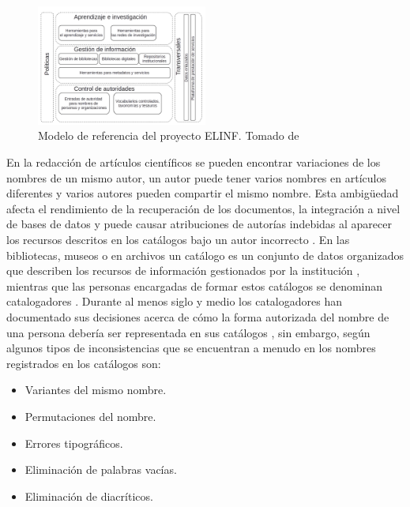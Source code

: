 \begin{figure}
\begin{center}
	\includegraphics[width=0.5\textwidth]{img/referenceModel.png}
\end{center}
\caption{Modelo de referencia del proyecto ELINF. Tomado de \citep{Ciudad-Ricardo2017}}
\label{fig: referenceModel}
\end{figure}

En la redacción de artículos científicos se pueden encontrar variaciones de los nombres de un mismo autor, un autor puede tener varios nombres en artículos diferentes y varios autores pueden compartir el mismo nombre. Esta ambigüedad afecta el rendimiento de la recuperación de los documentos, la integración a nivel de bases de datos y puede causar atribuciones de autorías indebidas al aparecer los recursos descritos en los catálogos bajo un autor incorrecto \citep{Han2005}. En las bibliotecas, museos o en archivos un catálogo es un conjunto de datos organizados que describen los recursos de información gestionados por la institución \citep{InternationalFederationofLibraryAssociationsandInstitutions2009}, mientras que las personas encargadas de formar estos catálogos se denominan catalogadores \citep{RealAcademiaEspanola2014}. Durante al menos siglo y medio los catalogadores han documentado sus decisiones acerca de cómo la forma autorizada del nombre de una persona debería ser representada en sus catálogos \citep{Tillett2009}, sin embargo, según \cite{Carrasco2016} algunos tipos de inconsistencias que se encuentran a menudo en los nombres registrados en los catálogos son:

\begin{itemize}
\item Variantes del mismo nombre.
\item Permutaciones del nombre.
\item Errores tipográficos.
\item Eliminación de palabras vacías.
\item Eliminación de diacríticos.
\end{itemize}

